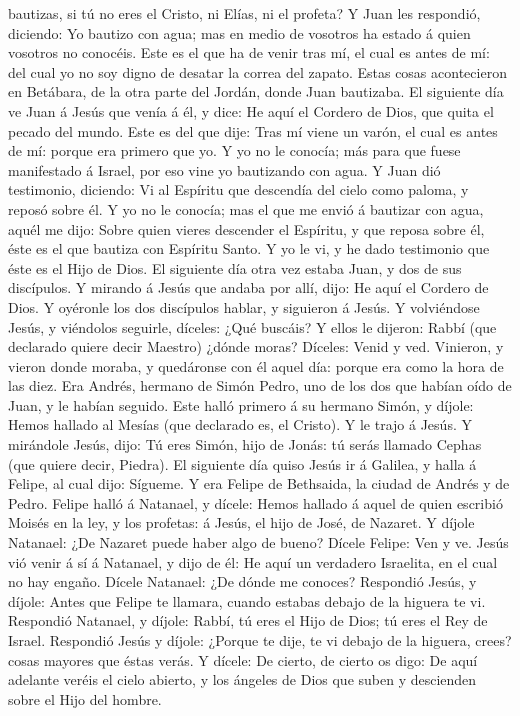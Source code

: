 bautizas, si tú no eres el Cristo, ni Elías, ni el profeta?
 Y Juan les respondió, diciendo: Yo bautizo con agua; mas
en medio de vosotros ha estado á quien vosotros no conocéis.
 Este es el que ha de venir tras mí, el cual es antes de
mí: del cual yo no soy digno de desatar la correa del zapato.
 Estas cosas acontecieron en Betábara, de la otra parte del
Jordán, donde Juan bautizaba.  El siguiente día ve Juan á
Jesús que venía á él, y dice: He aquí el Cordero de Dios, que quita el
pecado del mundo.  Este es del que dije: Tras mí viene un
varón, el cual es antes de mí: porque era primero que yo. 
Y yo no le conocía; más para que fuese manifestado á Israel, por eso
vine yo bautizando con agua.  Y Juan dió testimonio,
diciendo: Vi al Espíritu que descendía del cielo como paloma, y reposó
sobre él.  Y yo no le conocía; mas el que me envió á
bautizar con agua, aquél me dijo: Sobre quien vieres descender el
Espíritu, y que reposa sobre él, éste es el que bautiza con Espíritu
Santo.  Y yo le vi, y he dado testimonio que éste es el
Hijo de Dios.  El siguiente día otra vez estaba Juan, y dos
de sus discípulos.  Y mirando á Jesús que andaba por allí,
dijo: He aquí el Cordero de Dios.  Y oyéronle los dos
discípulos hablar, y siguieron á Jesús.  Y volviéndose
Jesús, y viéndolos seguirle, díceles: ¿Qué buscáis? Y ellos le dijeron:
Rabbí (que declarado quiere decir Maestro) ¿dónde moras? 
Díceles: Venid y ved. Vinieron, y vieron donde moraba, y quedáronse con
él aquel día: porque era como la hora de las diez.  Era
Andrés, hermano de Simón Pedro, uno de los dos que habían oído de Juan,
y le habían seguido.  Este halló primero á su hermano
Simón, y díjole: Hemos hallado al Mesías (que declarado es, el Cristo).
 Y le trajo á Jesús. Y mirándole Jesús, dijo: Tú eres
Simón, hijo de Jonás: tú serás llamado Cephas (que quiere decir,
Piedra).  El siguiente día quiso Jesús ir á Galilea, y
halla á Felipe, al cual dijo: Sígueme.  Y era Felipe de
Bethsaida, la ciudad de Andrés y de Pedro.  Felipe halló á
Natanael, y dícele: Hemos hallado á aquel de quien escribió Moisés en la
ley, y los profetas: á Jesús, el hijo de José, de Nazaret. 
Y díjole Natanael: ¿De Nazaret puede haber algo de bueno? Dícele Felipe:
Ven y ve.  Jesús vió venir á sí á Natanael, y dijo de él:
He aquí un verdadero Israelita, en el cual no hay engaño. 
Dícele Natanael: ¿De dónde me conoces? Respondió Jesús, y díjole: Antes
que Felipe te llamara, cuando estabas debajo de la higuera te vi.
 Respondió Natanael, y díjole: Rabbí, tú eres el Hijo de
Dios; tú eres el Rey de Israel.  Respondió Jesús y díjole:
¿Porque te dije, te vi debajo de la higuera, crees? cosas mayores que
éstas verás.  Y dícele: De cierto, de cierto os digo: De
aquí adelante veréis el cielo abierto, y los ángeles de Dios que suben y
descienden sobre el Hijo del hombre.

